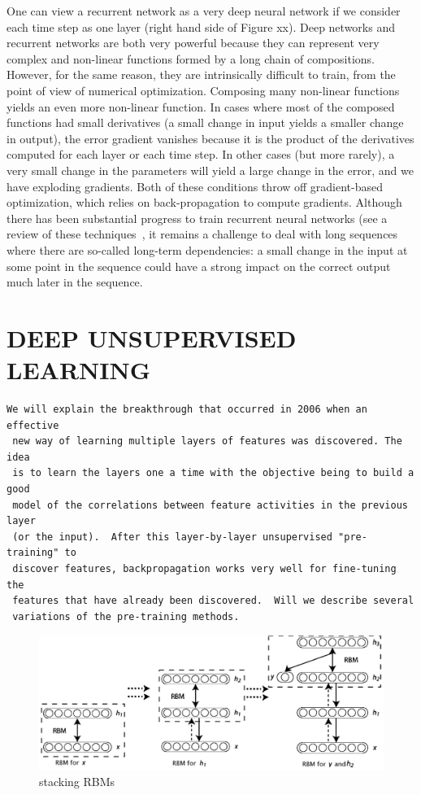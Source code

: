 \documentclass[11pt]{article} %
\begin{document}
One can view a recurrent network as a very deep neural network if we
consider each time step as one layer (right hand side of Figure xx). Deep
networks and recurrent networks are both very powerful because they can
represent very complex and non-linear functions formed by a long chain of
compositions. However, for the same reason, they are intrinsically
difficult to train, from the point of view of numerical
optimization. Composing many non-linear functions yields an even more
non-linear function. In cases where most of the composed functions had
small derivatives (a small change in input yields a smaller change in
output), the error gradient vanishes because it is the product of the
derivatives computed for each layer or each time step. In other cases (but
more rarely), a very small change in the parameters will yield a large
change in the error, and we have exploding gradients. Both of these
conditions throw off gradient-based optimization, which relies on
back-propagation to compute gradients. Although there has been substantial
progress to train recurrent neural networks (see a review of these
techniques~\citep{Pascanu+al-ICML2013-small}, it remains a challenge to deal with long
sequences where there are so-called long-term dependencies: a small change
in the input at some point in the sequence could have a strong impact on
the correct output much later in the sequence.


\section{DEEP UNSUPERVISED LEARNING}


\begin{verbatim}
We will explain the breakthrough that occurred in 2006 when an effective
 new way of learning multiple layers of features was discovered. The idea
 is to learn the layers one a time with the objective being to build a good
 model of the correlations between feature activities in the previous layer
 (or the input).  After this layer-by-layer unsupervised "pre-training" to
 discover features, backpropagation works very well for fine-tuning the
 features that have already been discovered.  Will we describe several
 variations of the pre-training methods.
\end{verbatim}


\begin{figure}[H]
\centerline{\includegraphics[width=0.7\linewidth]{stacked-rbms.png}}
\caption{stacking RBMs}
\end{figure}
\end{document}
